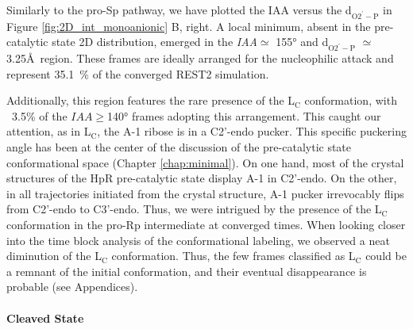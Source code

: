 \documentclass[journal=jacsat,manuscript=article]{achemso}
\begin{document}

Similarly to the pro-Sp pathway, we have plotted the IAA versus the d$_\mathrm{O2^{\prime}-P}$ 
in Figure \ref{fig:2D_int_monoanionic} B, right.
A local minimum, absent in the pre-catalytic state 2D distribution, 
emerged in the \textit{IAA}$\simeq $ 155° and d$_\mathrm{O2^{\prime}-P}$ $\simeq$ 3.25\AA\ region.
These frames are ideally arranged for the nucleophilic attack and represent 35.1~\% of the converged REST2 simulation.

Additionally, this region features the rare presence of the L$_\mathrm{C}$ conformation, 
with ~3.5\% of the $IAA\geq $140° frames adopting this arrangement.
This caught our attention, as in L$_\mathrm{C}$, the A-1 ribose is in a C2'-endo pucker.
This specific puckering angle has been at the center of the discussion of the pre-catalytic state conformational space (Chapter \ref{chap:minimal}).
On one hand, most of the crystal structures of the HpR pre-catalytic state display A-1 in C2'-endo.
On the other, in all trajectories initiated from the crystal structure, A-1 pucker irrevocably flips from C2'-endo to C3'-endo.
Thus, we were intrigued by the presence of the L$_\mathrm{C}$ conformation in the pro-Rp intermediate at converged times.
When looking closer into the time block analysis of the conformational labeling, we observed a neat diminution of the L$_\mathrm{C}$ conformation.
Thus, the few frames classified as L$_\mathrm{C}$ could be a remnant of the initial conformation, and their eventual disappearance is probable (see Appendices).


\paragraph{Cleaved State}
\end{document}
